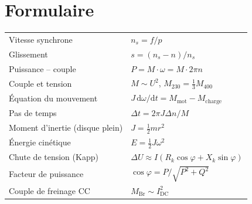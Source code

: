 \documentclass[11pt,a4paper]{article}
\begin{document}
\section{Formulaire}
\begin{center}
\renewcommand{\arraystretch}{1.5}
\begin{tabular}{@{}ll@{}}
\toprule
Vitesse synchrone & $n_s = f/p$\\
Glissement & $s = (n_s-n)/n_s$\\
Puissance -- couple & $P = M\cdot\omega = M\cdot2\pi n$\\
Couple et tension & $M\sim U^2$, \quad $M_{230} = \frac13M_{400}$\\
Équation du mouvement & $J\,\mathrm d\omega/\mathrm dt = M_\mathrm{mot} - M_\mathrm{charge}$\\
Pas de temps & $\Delta t = 2\pi J\Delta n/M$\\
Moment d'inertie (disque plein) & $J = \frac12 m r^2$\\
Énergie cinétique & $E = \frac12 J\omega^2$\\
Chute de tension (Kapp) & $\Delta U\approx I(R_k\cos\varphi + X_k\sin\varphi)$\\
Facteur de puissance & $\cos\varphi = P/\sqrt{P^2+Q^2}$\\
Couple de freinage CC & $M_\mathrm{Br}\sim I_\mathrm{DC}^2$\\
\bottomrule
\end{tabular}
\end{center}

\end{document}
